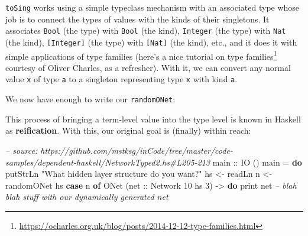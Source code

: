 \documentclass[]{article}
\newenvironment{Shaded}{\begin{snugshade}}{\end{snugshade}}
\newcommand{\CommentTok}[1]{\textcolor[rgb]{0.56,0.35,0.01}{\textit{#1}}}
\newcommand{\DataTypeTok}[1]{\textcolor[rgb]{0.13,0.29,0.53}{#1}}
\newcommand{\DecValTok}[1]{\textcolor[rgb]{0.00,0.00,0.81}{#1}}
\newcommand{\FunctionTok}[1]{\textcolor[rgb]{0.00,0.00,0.00}{#1}}
\newcommand{\KeywordTok}[1]{\textcolor[rgb]{0.13,0.29,0.53}{\textbf{#1}}}
\newcommand{\NormalTok}[1]{#1}
\newcommand{\OtherTok}[1]{\textcolor[rgb]{0.56,0.35,0.01}{#1}}
\newcommand{\StringTok}[1]{\textcolor[rgb]{0.31,0.60,0.02}{#1}}
\renewcommand{\href}[2]{#2\footnote{\url{#1}}}
\begin{document}
\texttt{toSing} works using a simple typeclass mechanism with an associated type
whose job is to connect the types of values with the kinds of their singletons.
It associates \texttt{Bool} (the type) with \texttt{Bool} (the kind),
\texttt{Integer} (the type) with \texttt{Nat} (the kind), \texttt{{[}Integer{]}}
(the type) with \texttt{{[}Nat{]}} (the kind), etc., and it does it with simple
applications of type families (here's a
\href{https://ocharles.org.uk/blog/posts/2014-12-12-type-families.html}{nice
tutorial on type families} courtesy of Oliver Charles, as a refresher). With it,
we can convert any normal value \texttt{x} of type \texttt{a} to a singleton
representing type \texttt{x} with kind \texttt{a}.

We now have enough to write our \texttt{randomONet}:

\begin{Shaded}
\end{Shaded}

This process of bringing a term-level value into the type level is known in
Haskell as \textbf{reification}. With this, our original goal is (finally)
within reach:

\begin{Shaded}
\begin{Highlighting}[]
\CommentTok{-- source: https://github.com/mstksg/inCode/tree/master/code-samples/dependent-haskell/NetworkTyped2.hs#L205-213}
\OtherTok{main ::} \DataTypeTok{IO}\NormalTok{ ()}
\NormalTok{main }\FunctionTok{=} \KeywordTok{do}
\NormalTok{    putStrLn }\StringTok{"What hidden layer structure do you want?"}
\NormalTok{    hs }\OtherTok{<-}\NormalTok{ readLn}
\NormalTok{    n  }\OtherTok{<-}\NormalTok{ randomONet hs}
    \KeywordTok{case}\NormalTok{ n }\KeywordTok{of}
      \DataTypeTok{ONet}\NormalTok{ (}\OtherTok{net ::} \DataTypeTok{Network} \DecValTok{10}\NormalTok{ hs }\DecValTok{3}\NormalTok{) }\OtherTok{->} \KeywordTok{do}
\NormalTok{        print net}
        \CommentTok{-- blah blah stuff with our dynamically generated net}
\end{Highlighting}
\end{Shaded}
\end{document}
